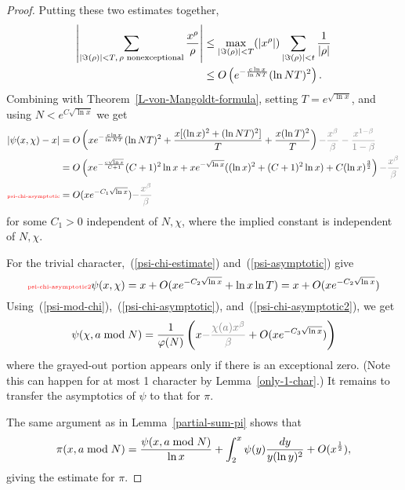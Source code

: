\begin{proof}
Putting these two estimates together,
\begin{align*}
\left| {\sum_{|\Im(\rho)|<T,\,\rho\text{ nonexceptional}}\frac{x^{\rho}}{\rho}} \right|
&\le \max_{|\Im(\rho)|<T}(|x^{\rho}|)\sum_{|\Im(\rho)|<t}\frac{1}{|\rho|}\\
&\le O\left( {e^{-\frac{c\ln x}{\ln NT}}(\ln NT)^2} \right).
\end{align*}
Combining with Theorem~\ref{L-von-Mangoldt-formula}, setting $T=e^{\sqrt{\ln x}}$, %
and using $N<e^{C\sqrt{\ln x}}$ we get 
\begin{align}
\nonumber
|\psi(x,\chi)-x|&
= O\pa{
xe^{-\frac{c\ln x}{\ln NT}}(\ln NT)^2+\frac{x[(\ln x)^2+(\ln NT)^2]}{T}+\frac{x(\ln T)^2}{T}
}{\color{gray}-\frac{x^{\be}}{\be}-\fc{x^{1-\be}}{1-\be}}\\
\nonumber
&=O\pa{
xe^{-\fc{c\sqrt{\ln x}}{C+1}}(C+1)^2\ln x +xe^{-\sqrt{\ln x}}((\ln x)^2+(C+1)^2\ln x) +C(\ln x)^{\fc 32}
}{\color{gray}-\frac{x^{\be}}{\be}}\\
\llabel{psi-chi-asymptotic}
&=O(xe^{-C_1\sqrt{\ln x}}){\color{gray}-\frac{x^{\be}}{\be}}
\end{align}
for some $C_1>0$ independent of $N,\chi$, where the implied constant is independent of $N,\chi$.

For the trivial character,~(\ref{psi-chi-estimate}) and~(\ref{psi-asymptotic}) give
\begin{equation}\llabel{psi-chi-asymptotic2}
\psi(x,\chi)=x+O(xe^{-C_2\sqrt{\ln x}}+\ln x\ln T)=x+O(xe^{-C_2\sqrt{\ln x}})
\end{equation}
Using~(\ref{psi-mod-chi}),~(\ref{psi-chi-asymptotic}), and~(\ref{psi-chi-asymptotic2}), we get
\[
\psi(\chi,a\bmod N)=\rc{\ph(N)}\pa{x{\color{gray} -\fc{\chi(a)x^{\be}}{\be}}+O(xe^{-C_3\sqrt{\ln x}})}
\]
where the grayed-out portion appears only if there is an exceptional zero. (Note this can happen for at most 1 character by Lemma~\ref{only-1-char}.) It remains to transfer the asymptotics of $\psi$ to that for $\pi$.

The same argument as in Lemma~\ref{partial-sum-pi} shows that
\[
\pi(x,a\bmod N)=\frac{\psi(x,a\bmod N)}{\ln x}+\int_2^x\psi(y)\frac{dy}{y(\ln y)^2}+O(x^{\frac{1}{2}}),
\]
giving the estimate for $\pi$.
\end{proof}

